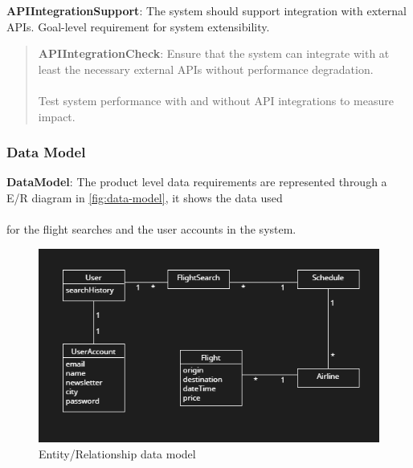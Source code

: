 \textbf{APIIntegrationSupport}: The system should support integration with external APIs. Goal-level requirement for system extensibility.
\begin{quote}
    \textbf{APIIntegrationCheck}: Ensure that the system can integrate with at least the necessary external APIs without performance degradation. \\ \\
    Test system performance with and without API integrations to measure impact.
\end{quote}

\subsubsection{Data Model}
\textbf{DataModel}: The product level data requirements are represented through a E/R diagram in \autoref{fig:data-model}, it shows the data used \\ \\
for the flight searches and the user accounts in the system.

\begin{figure}[H]
    \includegraphics[width=1\textwidth]{resources/dataRelations.PNG}
    \caption{Entity/Relationship data model}
    \label{fig:data-model}
\end{figure}

